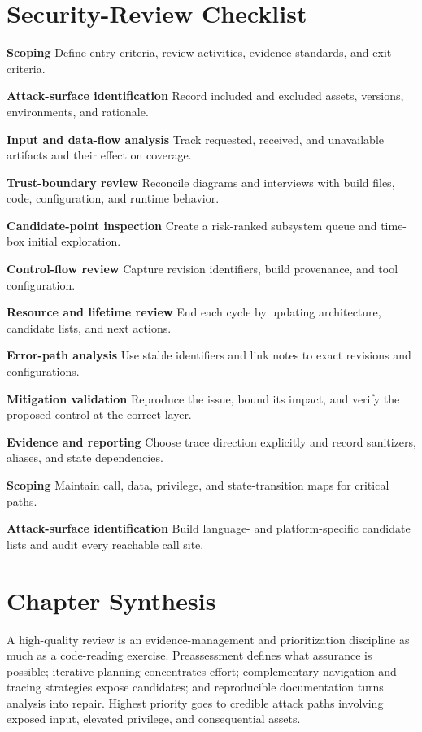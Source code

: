 \documentclass[11pt,letterpaper]{article}
\begin{document}
\section{Security-Review Checklist}
\begin{CornellChecklist}
\item \textbf{Scoping}
Define entry criteria, review activities, evidence standards, and exit criteria.
\item \textbf{Attack-surface identification}
Record included and excluded assets, versions, environments, and rationale.
\item \textbf{Input and data-flow analysis}
Track requested, received, and unavailable artifacts and their effect on coverage.
\item \textbf{Trust-boundary review}
Reconcile diagrams and interviews with build files, code, configuration, and runtime behavior.
\item \textbf{Candidate-point inspection}
Create a risk-ranked subsystem queue and time-box initial exploration.
\item \textbf{Control-flow review}
Capture revision identifiers, build provenance, and tool configuration.
\item \textbf{Resource and lifetime review}
End each cycle by updating architecture, candidate lists, and next actions.
\item \textbf{Error-path analysis}
Use stable identifiers and link notes to exact revisions and configurations.
\item \textbf{Mitigation validation}
Reproduce the issue, bound its impact, and verify the proposed control at the correct layer.
\item \textbf{Evidence and reporting}
Choose trace direction explicitly and record sanitizers, aliases, and state dependencies.
\item \textbf{Scoping}
Maintain call, data, privilege, and state-transition maps for critical paths.
\item \textbf{Attack-surface identification}
Build language- and platform-specific candidate lists and audit every reachable call site.
\end{CornellChecklist}
\section{Chapter Synthesis}
A high-quality review is an evidence-management and prioritization discipline as much as a code-reading exercise. Preassessment defines what assurance is possible; iterative planning concentrates effort; complementary navigation and tracing strategies expose candidates; and reproducible documentation turns analysis into repair. Highest priority goes to credible attack paths involving exposed input, elevated privilege, and consequential assets.
\end{document}
